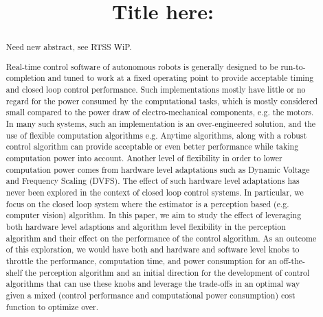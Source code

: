 \documentclass{article}[14pt]
\title{Title here:}
\begin{document}
\maketitle

\begin{abstract}
Need new abstract, see RTSS WiP.
	
	Real-time control software of autonomous robots is generally designed to be run-to-completion and tuned to work at a fixed operating point to provide acceptable timing and closed loop control performance. Such implementations mostly have little or no regard for the power consumed by the computational tasks, which is mostly considered small compared to the power draw of electro-mechanical components, e.g. the motors. In many such systems, such an implementation is an over-engineered solution, and the use of flexible computation algorithms e.g. Anytime algorithms, along with a robust control algorithm can provide acceptable or even better performance while taking computation power into account. Another level of flexibility in order to lower computation power comes from hardware level adaptations such as Dynamic Voltage and Frequency Scaling (DVFS). The effect of such hardware level adaptations has never been explored in the context of closed loop control systems. In particular, we focus on the closed loop system where the estimator is a perception based (e.g. computer vision) algorithm. In this paper, we aim to study the effect of leveraging both hardware level adaptions and algorithm level flexibility in the perception algorithm and their effect on the performance of the control algorithm. As an outcome of this exploration, we would have both and hardware and software level knobs to throttle the performance, computation time, and power consumption for an off-the-shelf the perception algorithm and an initial direction for the development of control algorithms that can use these knobs and leverage the trade-offs in an optimal way given a mixed (control performance and computational power consumption) cost function to optimize over.

\end{abstract}
\end{document}
